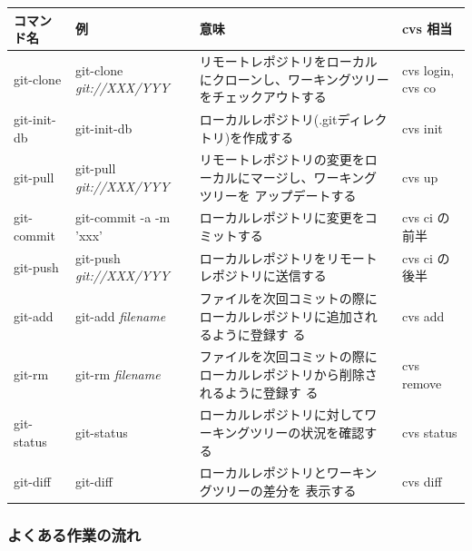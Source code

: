 \documentclass[mingoth,a4paper]{jsarticle}
\begin{document}
\begin{tabular}{|l|l|p{15em}|l|}
\hline
\hline
コマンド名 &例 &意味 & cvs 相当\\
\hline
git-clone & git-clone {\it git://XXX/YYY} & 
 リモートレポジトリをローカルにクローンし、ワーキングツリーをチェックアウトする & cvs login, cvs co \\
\hline
git-init-db & git-init-db &
 ローカルレポジトリ(.gitディレクトリ)を作成する & cvs init\\
\hline
git-pull & git-pull {\it git://XXX/YYY} &
 リモートレポジトリの変更をローカルにマージし、ワーキングツリーを
 アップデートする & cvs up \\
\hline
git-commit & git-commit -a -m 'xxx' & 
 ローカルレポジトリに変更をコミットする & cvs ci の前半\\
\hline
git-push & git-push {\it git://XXX/YYY} & 
 ローカルレポジトリをリモートレポジトリに送信する & cvs ci の後半\\ 
\hline
git-add & git-add {\it filename}&
 ファイルを次回コミットの際にローカルレポジトリに追加されるように登録す
 る & cvs add \\
\hline
git-rm & git-rm {\it filename} & 
 ファイルを次回コミットの際にローカルレポジトリから削除されるように登録す
 る & cvs remove \\
\hline
git-status & git-status & 
 ローカルレポジトリに対してワーキングツリーの状況を確認する &
 cvs status\\
\hline
git-diff & git-diff & ローカルレポジトリとワーキングツリーの差分を
 表示する & cvs diff\\
\hline
\hline
\end{tabular}

\subsubsection{よくある作業の流れ}
\end{document}
